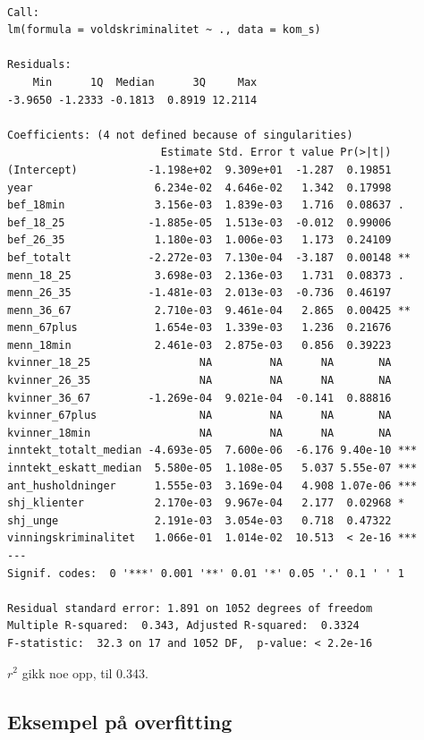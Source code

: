 \documentclass[
  letterpaper,
  DIV=11,
  numbers=noendperiod]{scrreprt}
\begin{document}
\begin{verbatim}

Call:
lm(formula = voldskriminalitet ~ ., data = kom_s)

Residuals:
    Min      1Q  Median      3Q     Max 
-3.9650 -1.2333 -0.1813  0.8919 12.2114 

Coefficients: (4 not defined because of singularities)
                        Estimate Std. Error t value Pr(>|t|)    
(Intercept)           -1.198e+02  9.309e+01  -1.287  0.19851    
year                   6.234e-02  4.646e-02   1.342  0.17998    
bef_18min              3.156e-03  1.839e-03   1.716  0.08637 .  
bef_18_25             -1.885e-05  1.513e-03  -0.012  0.99006    
bef_26_35              1.180e-03  1.006e-03   1.173  0.24109    
bef_totalt            -2.272e-03  7.130e-04  -3.187  0.00148 ** 
menn_18_25             3.698e-03  2.136e-03   1.731  0.08373 .  
menn_26_35            -1.481e-03  2.013e-03  -0.736  0.46197    
menn_36_67             2.710e-03  9.461e-04   2.865  0.00425 ** 
menn_67plus            1.654e-03  1.339e-03   1.236  0.21676    
menn_18min             2.461e-03  2.875e-03   0.856  0.39223    
kvinner_18_25                 NA         NA      NA       NA    
kvinner_26_35                 NA         NA      NA       NA    
kvinner_36_67         -1.269e-04  9.021e-04  -0.141  0.88816    
kvinner_67plus                NA         NA      NA       NA    
kvinner_18min                 NA         NA      NA       NA    
inntekt_totalt_median -4.693e-05  7.600e-06  -6.176 9.40e-10 ***
inntekt_eskatt_median  5.580e-05  1.108e-05   5.037 5.55e-07 ***
ant_husholdninger      1.555e-03  3.169e-04   4.908 1.07e-06 ***
shj_klienter           2.170e-03  9.967e-04   2.177  0.02968 *  
shj_unge               2.191e-03  3.054e-03   0.718  0.47322    
vinningskriminalitet   1.066e-01  1.014e-02  10.513  < 2e-16 ***
---
Signif. codes:  0 '***' 0.001 '**' 0.01 '*' 0.05 '.' 0.1 ' ' 1

Residual standard error: 1.891 on 1052 degrees of freedom
Multiple R-squared:  0.343, Adjusted R-squared:  0.3324 
F-statistic:  32.3 on 17 and 1052 DF,  p-value: < 2.2e-16
\end{verbatim}

\(r^2\) gikk noe opp, til 0.343.

\subsection{Eksempel på overfitting}\label{eksempel-puxe5-overfitting}
\end{document}
